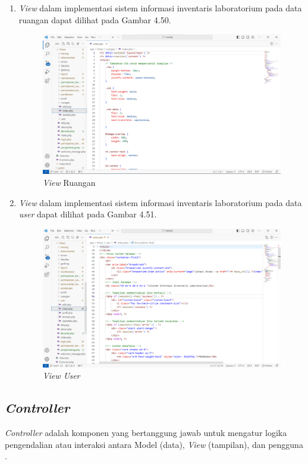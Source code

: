 \begin{enumerate}
  \item \textit{View} dalam implementasi sistem informasi inventaris laboratorium pada data ruangan dapat dilihat pada Gambar 4.50.
        \begin{figure}
          \centering
          \includegraphics[width=0.82\linewidth]{konten//gambar/view ruangan.png}
          \caption{\textit{View} Ruangan}
          \label{fig:enter-label}
        \end{figure}

  \item \textit{View} dalam implementasi sistem informasi inventaris laboratorium pada data \textit{user} dapat dilihat pada Gambar 4.51.
        \begin{figure}
          \centering
          \includegraphics[width=0.82\linewidth]{konten//gambar/view user.png}
          \caption{\textit{View User}}
          \label{fig:enter-label}
        \end{figure}

\end{enumerate}

\subsection{\textit{Controller}}
\textit{Controller} adalah komponen yang bertanggung jawab untuk mengatur logika pengendalian atau interaksi antara Model (data), \textit{View} (tampilan), dan pengguna \cite{rahman2018perancangan}.

